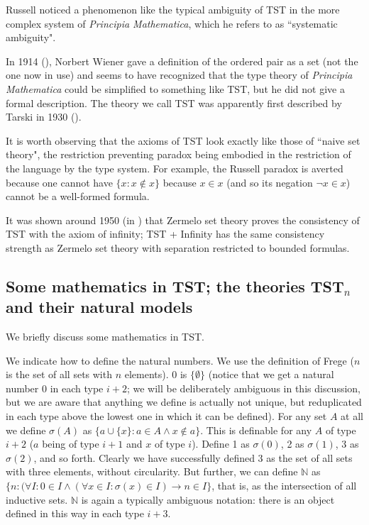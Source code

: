 \documentclass[112pt]{article}
\begin{document}
Russell noticed a phenomenon like the typical ambiguity of TST in the more complex system of {\em Principia Mathematica\/}, which he refers to as ``systematic ambiguity".

In 1914 (\cite{wiener}), Norbert Wiener gave a definition of the ordered pair as a set (not the one now in use) and seems to have recognized that the type theory of {\em Principia Mathematica\/} could be simplified to something like TST, but he did not give a formal description.  The theory we call TST was apparently first described by Tarski in 1930 (\cite{tarskiontst}).

It is worth observing that the axioms of TST look exactly like those of ``naive set theory", the restriction preventing paradox being embodied in the restriction of the language by the type system.
For example, the Russell paradox is averted because one cannot have $\{x:x \not\in x\}$ because $x \in x$ (and so its negation $\neg x \in x$) cannot be a well-formed formula.

It was shown around 1950 (in \cite{kemeny}) that Zermelo set theory proves the consistency of TST with the axiom of infinity;  TST + Infinity has the same consistency strength as
Zermelo set theory with separation restricted to bounded formulas.


\newpage

\subsection{Some mathematics in TST;  the theories TST$_n$ and their natural models}

We briefly discuss some mathematics in TST.

We indicate how to define the natural numbers.  We use the definition of Frege ($n$ is the set of all sets with $n$ elements).  0 is $\{\emptyset\}$ (notice that we get a natural number 0 in each type $i+2$;  we will be deliberately ambiguous in this discussion, but we are aware that anything we define is actually not unique, but reduplicated in each type above the lowest one in which it can be defined).  For any set $A$ at all we define $\sigma(A)$ as $\{a \cup \{x\}:a \in A \wedge x \not\in a\}$.  This is definable for any $A$ of type $i+2$ ($a$ being of type $i+1$ and $x$ of type $i$).  Define 1 as $\sigma(0)$, 2 as $\sigma(1)$,  3 as $\sigma(2)$, and so forth.  Clearly we have successfully defined 3 as the set of all sets with three elements, without circularity.
But further, we can define $\mathbb N$ as $\{n:(\forall I:0 \in I \wedge (\forall x \in I:\sigma(x) \in I) \rightarrow n \in I\}$, that is, as the intersection of all inductive sets.
$\mathbb N$ is again a typically ambiguous notation:  there is an object defined in this way in each type $i+3$.
\end{document}
